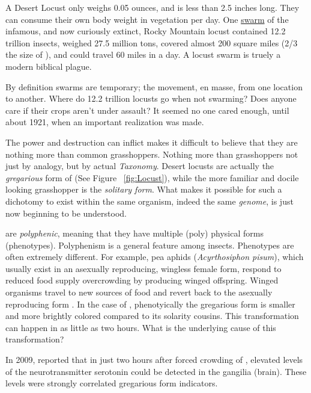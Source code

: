 A Desert Locust only weighs 0.05 ounces, and is less than 2.5 inches long. They can consume their own body weight in vegetation per day. One \href{http://animaldiversity.ummz.umich.edu/site/accounts/information/Melanoplus_spretus.html}{swarm} of the infamous, and now curiously extinct, Rocky Mountain locust contained 12.2 trillion insects, weighed 27.5 million tons, covered almost 200 square miles (2/3 the size of ), and could travel 60 miles in a day. A locust swarm is truely a modern biblical plague.

By definition swarms are temporary; the movement, en masse, from one
 location to another. Where do 12.2 trillion locusts go when not swarming? Does anyone care if their crops aren't under assault? It seemed no one cared enough, until about 1921, when an important realization was made.

 The power and destruction \locusts{} can inflict makes it difficult to believe that they are nothing more than common grasshoppers. Nothing more than grasshoppers not just by analogy, but by actual \textit{Taxonomy}. Desert locusts are actually the \textit{gregarious} form  of \locusts{} (See Figure ~\ref{fig:Locust}), while the more familiar and docile looking grasshopper is the \textit{solitary form}. What makes it possible for such a dichotomy to exist within the same organism, indeed the same \textit{genome}, is just now beginning to be understood.

\locusts{} are \textit{polyphenic}, meaning that they have multiple (poly) physical forms (phenotypes). Polyphenism is a general feature among insects. Phenotypes are often extremely different. For example, pea aphids (\textit{Acyrthosiphon pisum}), which usually exist in an asexually reproducing, wingless female form, respond to reduced food supply overcrowding by producing winged offspring. Winged organisms travel to new sources of food and revert back to the asexually reproducing form \citep{Shingleton2003,Purandare2014b}. In the case of \locusts{}, phenotyically the gregarious form is smaller and more brightly colored compared to its solarity cousins. This transformation can happen in as little as two hours. What is the underlying cause of this transformation?

In 2009, \citet{Anstey2009} reported that in just two hours after forced crowding of \locusts{}, elevated levels of the neurotransmitter serotonin could be detected in the gangilia (brain). These levels were strongly correlated gregarious form indicators.
\citep{Anstey2009}

